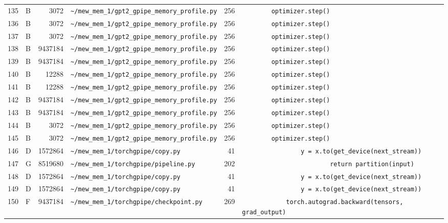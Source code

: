 \documentclass{article}
\begin{document}
\begin{longtable}{r l r p{6.5cm} r p{7.0cm}}
135 & B & 3072 & \lstinline|~/mew_mem_1/gpt2_gpipe_memory_profile.py| & 256 & \lstinline|        optimizer.step()| \\
136 & B & 3072 & \lstinline|~/mew_mem_1/gpt2_gpipe_memory_profile.py| & 256 & \lstinline|        optimizer.step()| \\
137 & B & 3072 & \lstinline|~/mew_mem_1/gpt2_gpipe_memory_profile.py| & 256 & \lstinline|        optimizer.step()| \\
138 & B & 9437184 & \lstinline|~/mew_mem_1/gpt2_gpipe_memory_profile.py| & 256 & \lstinline|        optimizer.step()| \\
139 & B & 9437184 & \lstinline|~/mew_mem_1/gpt2_gpipe_memory_profile.py| & 256 & \lstinline|        optimizer.step()| \\
140 & B & 12288 & \lstinline|~/mew_mem_1/gpt2_gpipe_memory_profile.py| & 256 & \lstinline|        optimizer.step()| \\
141 & B & 12288 & \lstinline|~/mew_mem_1/gpt2_gpipe_memory_profile.py| & 256 & \lstinline|        optimizer.step()| \\
142 & B & 9437184 & \lstinline|~/mew_mem_1/gpt2_gpipe_memory_profile.py| & 256 & \lstinline|        optimizer.step()| \\
143 & B & 9437184 & \lstinline|~/mew_mem_1/gpt2_gpipe_memory_profile.py| & 256 & \lstinline|        optimizer.step()| \\
144 & B & 3072 & \lstinline|~/mew_mem_1/gpt2_gpipe_memory_profile.py| & 256 & \lstinline|        optimizer.step()| \\
145 & B & 3072 & \lstinline|~/mew_mem_1/gpt2_gpipe_memory_profile.py| & 256 & \lstinline|        optimizer.step()| \\
146 & D & 1572864 & \lstinline|~/mew_mem_1/torchgpipe/copy.py| & 41 & \lstinline|                y = x.to(get_device(next_stream))| \\
147 & G & 8519680 & \lstinline|~/mew_mem_1/torchgpipe/pipeline.py| & 202 & \lstinline|                        return partition(input)| \\
148 & D & 1572864 & \lstinline|~/mew_mem_1/torchgpipe/copy.py| & 41 & \lstinline|                y = x.to(get_device(next_stream))| \\
149 & D & 1572864 & \lstinline|~/mew_mem_1/torchgpipe/copy.py| & 41 & \lstinline|                y = x.to(get_device(next_stream))| \\
150 & F & 9437184 & \lstinline|~/mew_mem_1/torchgpipe/checkpoint.py| & 269 & \lstinline|            torch.autograd.backward(tensors, grad_output)| \\

\end{longtable}
\end{document}
